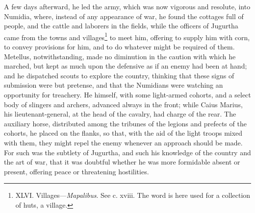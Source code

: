 A few days afterward, he led the army, which was now vigorous and
resolute, into Numidia, where, instead of any appearance of war, he
found the cottages full of people, and the cattle and laborers in the
fields, while the officers of Jugurtha came from the towns and
villages\footnote{XLVI. Villages—\emph{Mapalibus}. See c. xviii. The word is here
used for a collection of huts, a village.} to meet him, offering to supply him with corn, to convey
provisions for him, and to do whatever might be required of them.
Metellus, notwithstanding, made no diminution in the caution with
which he marched, but kept as much upon the defensive as if an enemy
had been at hand; and he dispatched scouts to explore the country,
thinking that these signs of submission were but pretense, and that
the Numidians were watching an opportunity for treachery. He himself,
with some light-armed cohorts, and a select body of slingers and
archers, advanced always in the front; while Caius Marius, his
lieutenant-general, at the head of the cavalry, had charge of the
rear. The auxiliary horse, distributed among the tribunes of the
legions and prefects of the cohorts, he placed on the flanks, so that,
with the aid of the light troops mixed with them, they might repel the
enemy whenever an approach should be made. For such was the subtlety
of Jugurtha, and such his knowledge of the country and the art of war,
that it was doubtful whether he was more formidable absent or present,
offering peace or threatening hostilities.

